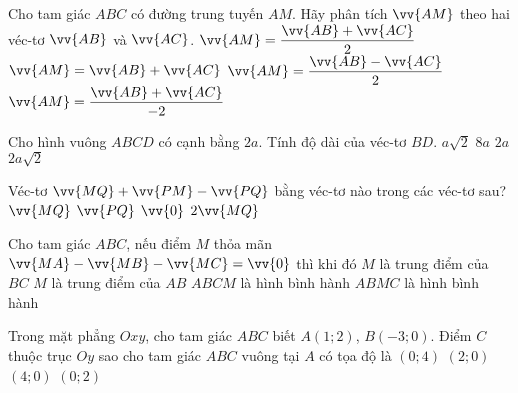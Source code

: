 \begin{ex}%
	Cho tam giác $ABC$ có đường trung tuyến $AM$. Hãy phân tích $\vv{AM}$ theo hai véc-tơ $\vv{AB}$ và $\vv{AC}$.
	\choice
	{\True$\vv{AM}=\dfrac{\vv{AB}+\vv{AC}}{2}$}
	{$\vv{AM}=\vv{AB}+\vv{AC}$}
	{$\vv{AM}=\dfrac{\vv{AB}-\vv{AC}}{2}$}
	{$\vv{AM}=\dfrac{\vv{AB}+\vv{AC}}{-2}$}
\end{ex}
\begin{ex}%
	Cho hình vuông $ABCD$ có cạnh bằng $2a$. Tính độ dài của véc-tơ $BD$.
	\choice
	{$a\sqrt{2}$}
	{$8a$}
	{$2a$}
	{\True $2a\sqrt{2}$}
\end{ex}
\begin{ex}%
	Véc-tơ $\vv{MQ}+\vv{PM}-\vv{PQ}$ bằng véc-tơ nào trong các véc-tơ sau?
	\choice
	{$\vv{MQ}$}
	{$\vv{PQ}$}
	{\True $\vv{0}$}
	{$2\vv{MQ}$}
\end{ex}
\begin{ex}%
	Cho tam giác $ABC$, nếu điểm $M$ thỏa mãn $\vv{MA}-\vv{MB}-\vv{MC}=\vv{0}$ thì khi đó
	\choice
	{$M$ là trung điểm của $BC$}
	{$M$ là trung điểm của $AB$}
	{$ABCM$ là hình bình hành}
	{\True $ABMC$ là hình bình hành}
\end{ex}
\begin{ex}%
	Trong mặt phẳng $Oxy$, cho tam giác $ABC$ biết $A(1;2)$, $B(-3;0)$. Điểm $C$ thuộc trục $Oy$ sao cho tam giác $ABC$ vuông tại $A$ có tọa độ là
	\choice
	{\True $(0;4)$}
	{$(2;0)$}
	{$(4;0)$}
	{$(0;2)$}
\end{ex}
